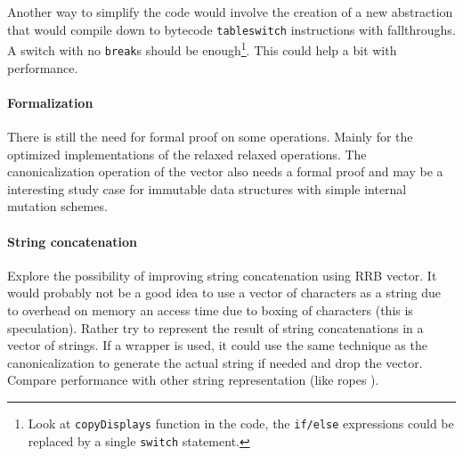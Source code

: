 Another way to simplify the code would involve the creation of a new abstraction that would compile down to bytecode \texttt{tableswitch} instructions with fallthroughs. A switch with no \texttt{break}s should be enough\footnote{Look at \texttt{copyDisplays} function in the code, the \texttt{if/else} expressions could be replaced by a single \texttt{switch} statement.}. This could help a bit with performance.

\paragraph{Formalization}
There is still the need for formal proof on some operations. Mainly for the optimized implementations of the relaxed relaxed operations. The canonicalization operation of the vector also needs a formal proof and may be a interesting study case for immutable data structures with simple internal mutation schemes.

\paragraph{String concatenation} 
Explore the possibility of improving string concatenation using RRB vector. It would probably not be a good idea to use a vector of characters as a string due to overhead on memory an access time due to boxing of characters (this is speculation). Rather try to represent the result of string concatenations in a vector of strings. If a wrapper is used, it could use the same technique as the canonicalization to generate the actual string if needed and drop the vector. Compare performance with other string representation (like ropes \cite{SPE:SPE4380251203}).

